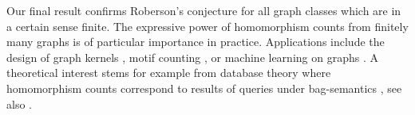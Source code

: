\documentclass[3p,final]{elsarticle}
\renewcommand\phi\varphi
\DeclareMathOperator{\cl}{cl}
\begin{document}
%	
%	


	Our final result confirms Roberson's conjecture for all graph classes which are in a certain sense finite.
	The expressive power of homomorphism counts from finitely many graphs is of particular importance in practice. 
	Applications include the design of graph kernels \cite{KriegeJM20}, motif counting \cite{AlonDHHS08,milo2002network}, or machine learning on graphs \cite{BeaujeanSY21,NguyenM20,Grohe-x2vec}.
	A theoretical interest stems for example from database theory where homomorphism counts correspond to results of queries under bag-semantics \cite{chaudhuri_optimization_1993,kwiecien_determinacy_2022}, 
	see also \cite{chen_algorithms_2022}.
	
\end{document}
